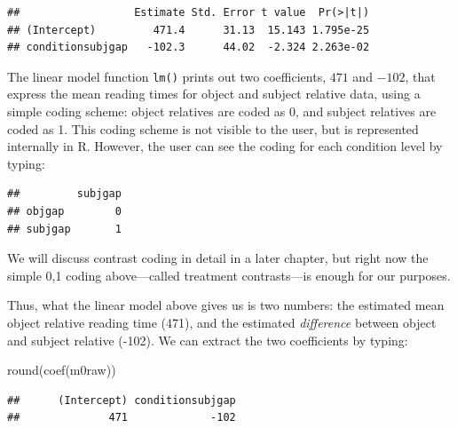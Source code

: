 \documentclass[
  12pt,
]{krantz}
\newenvironment{Shaded}{\begin{snugshade}}{\end{snugshade}}
\newcommand{\DocumentationTok}[1]{\textcolor[rgb]{0.56,0.35,0.01}{\textbf{\textit{#1}}}}
\newcommand{\FunctionTok}[1]{\textcolor[rgb]{0.00,0.00,0.00}{#1}}
\newcommand{\NormalTok}[1]{#1}
\newcommand{\OtherTok}[1]{\textcolor[rgb]{0.56,0.35,0.01}{#1}}
\newcommand{\SpecialCharTok}[1]{\textcolor[rgb]{0.00,0.00,0.00}{#1}}
\theoremstyle{definition}
\theoremstyle{definition}
\theoremstyle{definition}
\theoremstyle{definition}
\theoremstyle{remark}
\begin{document}
\begin{verbatim}
##                  Estimate Std. Error t value  Pr(>|t|)
## (Intercept)         471.4      31.13  15.143 1.795e-25
## conditionsubjgap   -102.3      44.02  -2.324 2.263e-02
\end{verbatim}

The linear model function \texttt{lm()} prints out two coefficients, \(471\) and \(-102\), that express the mean reading times for object and subject relative data, using a simple coding scheme: object relatives are coded as 0, and subject relatives are coded as 1. This coding scheme is not visible to the user, but is represented internally in R. However, the user can see the coding for each condition level by typing:

\begin{Shaded}
\end{Shaded}

\begin{verbatim}
##         subjgap
## objgap        0
## subjgap       1
\end{verbatim}

We will discuss contrast coding in detail in a later chapter, but right now the simple 0,1 coding above---called treatment contrasts---is enough for our purposes.

Thus, what the linear model above gives us is two numbers: the estimated mean object relative reading time (471), and the estimated \emph{difference} between object and subject relative (-102). We can extract the two coefficients by typing:

\begin{Shaded}
\begin{Highlighting}[]
\FunctionTok{round}\NormalTok{(}\FunctionTok{coef}\NormalTok{(m0raw))}
\end{Highlighting}
\end{Shaded}

\begin{verbatim}
##      (Intercept) conditionsubjgap 
##              471             -102
\end{verbatim}
\end{document}
